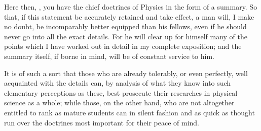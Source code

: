 \documentclass{stex}
\begin{document}
Here then, , you have the chief doctrines of Physics in the form of a summary.
So that, if this statement be accurately retained and take effect, a man will, I make no doubt, be incomparably better equipped than his fellows, even if he should never go into all the exact details.
For he will clear up for himself many of the points which I have worked out in detail in my complete exposition; and the summary itself, if borne in mind, will be of constant service to him.

It is of such a sort that those who are already tolerably, or even perfectly, well acquainted with the details can, by analysis of what they know into such elementary perceptions as these, best prosecute their researches in physical science as a whole; while those, on the other hand, who are not altogether entitled to rank as mature students can in silent fashion and as quick as thought run over the doctrines most important for their peace of mind.
\end{document}
